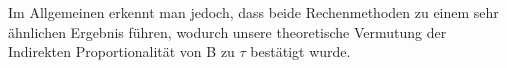 Im Allgemeinen erkennt man jedoch, dass beide Rechenmethoden zu einem sehr ähnlichen Ergebnis führen, wodurch unsere theoretische Vermutung der Indirekten Proportionalität von B zu $\tau$ bestätigt wurde. 





















































